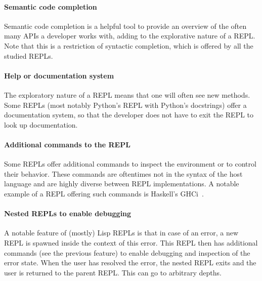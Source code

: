 \paragraph{Semantic code completion} Semantic code completion is a helpful tool
to provide an overview of the often many APIs a developer works with, adding to
the explorative nature of a REPL. Note that this is a restriction of syntactic
completion, which is offered by all the studied REPLs.

\paragraph{Help or documentation system} The exploratory nature of a REPL means
that one will often see new methods. Some REPLs (most notably Python's REPL with
Python's docstrings) offer a documentation system, so that the developer does
not have to exit the REPL to look up documentation.

\paragraph{Additional commands to the REPL} Some REPLs offer additional commands
to inspect the environment or to control their behavior. These commands are
oftentimes not in the syntax of the host language and are highly diverse between
REPL implementations. A notable example of a REPL offering such commands is
Haskell's GHCi~\cite{GHCi-commands}.

\paragraph{Nested REPLs to enable debugging} A notable feature of (mostly) Lisp
REPLs is that in case of an error, a new REPL is spawned inside the context of
this error. This REPL then has additional commands (see the previous feature) to
enable debugging and inspection of the error state. When the user has
resolved the error, the nested REPL exits and the user is returned to the
parent REPL. This can go to arbitrary depths.

